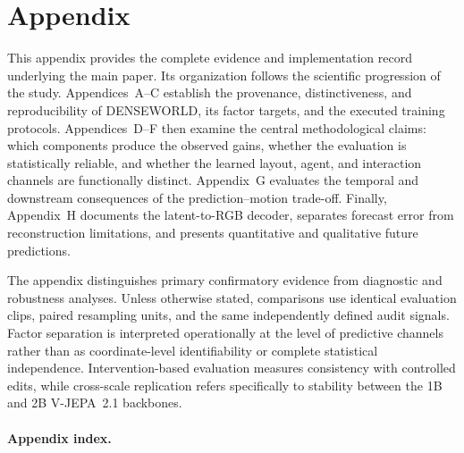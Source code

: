 \appendix

\section*{Appendix}

This appendix provides the complete evidence and implementation record
underlying the main paper. Its organization follows the scientific
progression of the study. Appendices~A--C establish the provenance,
distinctiveness, and reproducibility of DENSEWORLD, its factor targets,
and the executed training protocols. Appendices~D--F then examine the
central methodological claims: which components produce the observed
gains, whether the evaluation is statistically reliable, and whether
the learned layout, agent, and interaction channels are functionally
distinct. Appendix~G evaluates the temporal and downstream consequences
of the prediction--motion trade-off. Finally, Appendix~H documents the
latent-to-RGB decoder, separates forecast error from reconstruction
limitations, and presents quantitative and qualitative future
predictions.

The appendix distinguishes primary confirmatory evidence from
diagnostic and robustness analyses. Unless otherwise stated,
comparisons use identical evaluation clips, paired resampling units,
and the same independently defined audit signals. Factor separation is
interpreted operationally at the level of predictive channels rather
than as coordinate-level identifiability or complete statistical
independence. Intervention-based evaluation measures consistency with
controlled edits, while cross-scale replication refers specifically to
stability between the 1B and 2B V-JEPA~2.1 backbones.

\paragraph{Appendix index.}

